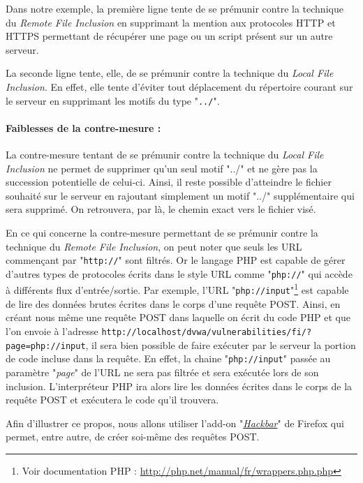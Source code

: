 Dans notre exemple, la première ligne tente de se prémunir contre la technique du \textit{Remote File Inclusion} en supprimant la mention aux protocoles HTTP et HTTPS permettant de récupérer une page ou un script présent sur un autre serveur.

La seconde ligne tente, elle, de se prémunir contre la technique du \textit{Local File Inclusion}. En effet, elle tente d'éviter tout déplacement du répertoire courant sur le serveur en supprimant les motifs du type "\texttt{../}".

\paragraph{Faiblesses de la contre-mesure :}

La contre-mesure tentant de se prémunir contre la technique du \textit{Local File Inclusion} ne permet de supprimer qu'un seul motif "../" et ne gère pas la succession potentielle de celui-ci. Ainsi, il reste possible d'atteindre le fichier souhaité sur le serveur en rajoutant simplement un motif "../" supplémentaire qui sera supprimé. On retrouvera, par là, le chemin exact vers le fichier visé.

En ce qui concerne la contre-mesure permettant de se prémunir contre la technique du \textit{Remote File Inclusion}, on peut noter que seuls les URL commençant par "\texttt{http://}" sont filtrés. Or le langage PHP est capable de gérer d'autres types de protocoles écrits dans le style URL comme "\texttt{php://}" qui accède à différents flux d'entrée/sortie. Par exemple, l'URL "\texttt{php://input}"\footnote{Voir documentation PHP : \url{http://php.net/manual/fr/wrappers.php.php}} est capable de lire des données brutes écrites dans le corps d'une requête POST. Ainsi, en créant nous même une requête POST dans laquelle on écrit du code PHP et que l'on envoie à l'adresse \texttt{http://localhost/dvwa/vulnerabilities/fi/?page=php://input}, il sera bien possible de faire exécuter par le serveur la portion de code incluse dans la requête. En effet, la chaine "\texttt{php://input}" passée au paramètre "\textit{page}" de l'URL ne sera pas filtrée et sera exécutée lors de son inclusion. L'interpréteur PHP ira alors lire les données écrites dans le corps de la requête POST et exécutera le code qu'il trouvera.

Afin d'illustrer ce propos, nous allons utiliser l'add-on "\href{https://addons.mozilla.org/fr/firefox/addon/hackbar/}{\textit{Hackbar}}" de Firefox qui permet, entre autre, de créer soi-même des requêtes POST.


